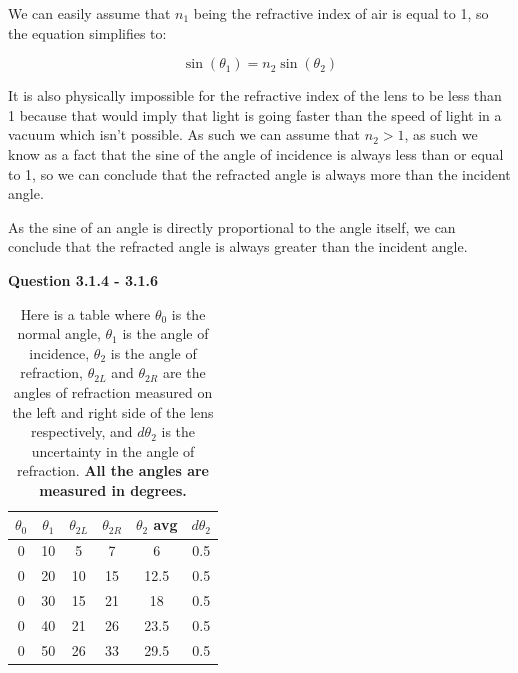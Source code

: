 \documentclass[a4paper,12pt]{article}
\begin{document}
We can easily assume that $n_1$ being the refractive index of air is equal to 1, so the equation simplifies to:

\begin{equation}
    \sin(\theta_1) = n_2 \sin(\theta_2)
\end{equation}

It is also physically impossible for the refractive index of the lens to be less than 1 because that would imply that light is going faster than the speed of light in a vacuum which isn't possible. As such we can assume that $n_2 > 1$, as such we know as a fact that the sine of the angle of incidence is always less than or equal to 1, so we can conclude that the refracted angle is always more than the incident angle.

\vspace{0.1cm}

As the sine of an angle is directly proportional to the angle itself, we can conclude that the refracted angle is always greater than the incident angle.

\vspace{3cm}

\noindent \textbf{\LARGE Question 3.1.4 - 3.1.6}

\vspace{0.4cm}

\begin{table}[h]
    \centering
    \begin{tabular}{cccccc}
        \toprule
        $\theta_0$ & $\theta_1$ & $\theta_{2L}$ & $\theta_{2R}$ & $\theta_2$ avg & $d\theta_2$ \\
        \midrule
        0  & 10  & 5  & 7  & 6   & 0.5 \\
        0  & 20  & 10 & 15 & 12.5 & 0.5 \\
        0  & 30  & 15 & 21 & 18   & 0.5 \\
        0  & 40  & 21 & 26 & 23.5 & 0.5 \\
        0  & 50  & 26 & 33 & 29.5 & 0.5 \\
        \bottomrule
    \end{tabular}
    \caption{Here is a table where $\theta_0$ is the normal angle, $\theta_1$ is the angle of incidence, $\theta_2$ is the angle of refraction, $\theta_{2L}$ and $\theta_{2R}$ are the angles of refraction measured on the left and right side of the lens respectively, and $d\theta_2$ is the uncertainty in the angle of refraction. \textbf{All the angles are measured in degrees.}}
\end{table}
\end{document}
